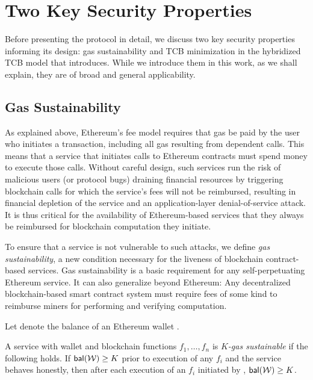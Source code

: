\section{Two Key Security Properties}

Before presenting the \tc protocol in detail, we discuss two key security properties informing its design: gas sustainability and TCB minimization in the hybridized TCB model that \tc introduces. While we introduce them in this work, as we shall explain, they are of broad and general applicability.

\subsection{Gas Sustainability}
\label{sec:gas-sustainability}

As explained above, Ethereum's fee model requires that gas be paid by the user who initiates a transaction, including all gas resulting from dependent calls. 
This means that a service that initiates calls to Ethereum contracts must spend money to execute those calls.
Without careful design, such services run the risk of malicious users (or protocol bugs) draining financial resources by triggering blockchain calls for which the service's fees will not be reimbursed, resulting in financial depletion of the service and an application-layer denial-of-service attack.
It is thus critical for the availability of Ethereum-based services that they always be reimbursed for blockchain computation they initiate.

To ensure that a service is not vulnerable to such attacks, we define \emph{gas sustainability}, a new condition necessary for the liveness of blockchain contract-based services. Gas sustainability is a basic requirement for any self-perpetuating Ethereum service. It can also generalize beyond Ethereum: Any decentralized blockchain-based smart contract system must require fees of some kind to reimburse miners for performing and verifying computation. 

Let \bal{\wallet} denote the balance of an Ethereum wallet \wallet.

\begin{definition}
  \label{def:gas-sustainability}
  A service with wallet \wallet and blockchain functions $f_1, \dotsc, f_n$ is \emph{$K$-gas sustainable} if the following holds.
If $\bal{\wallet} \geq K$ prior to execution of any $f_i$ and the service behaves honestly,
  then after each execution of an $f_i$ initiated by \wallet, $\bal{\wallet} \geq K$.
\end{definition}

